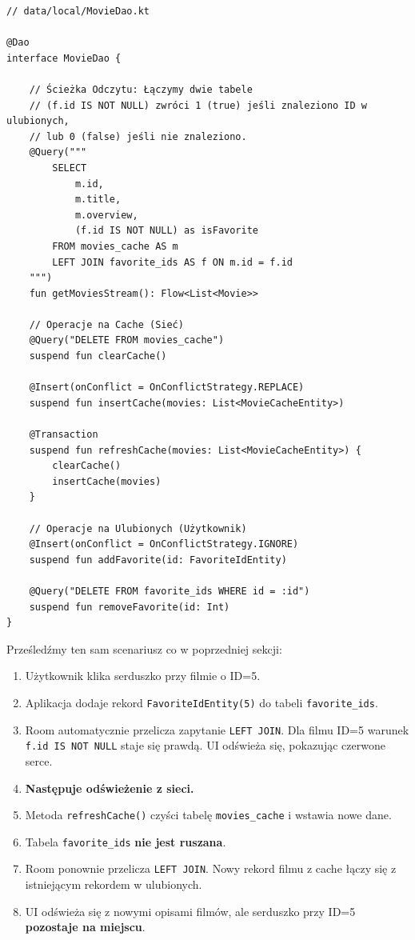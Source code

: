 \begin{verbatim}
// data/local/MovieDao.kt

@Dao
interface MovieDao {

    // Ścieżka Odczytu: Łączymy dwie tabele
    // (f.id IS NOT NULL) zwróci 1 (true) jeśli znaleziono ID w ulubionych,
    // lub 0 (false) jeśli nie znaleziono.
    @Query("""
        SELECT 
            m.id, 
            m.title, 
            m.overview,
            (f.id IS NOT NULL) as isFavorite
        FROM movies_cache AS m
        LEFT JOIN favorite_ids AS f ON m.id = f.id
    """)
    fun getMoviesStream(): Flow<List<Movie>>

    // Operacje na Cache (Sieć)
    @Query("DELETE FROM movies_cache")
    suspend fun clearCache()

    @Insert(onConflict = OnConflictStrategy.REPLACE)
    suspend fun insertCache(movies: List<MovieCacheEntity>)

    @Transaction
    suspend fun refreshCache(movies: List<MovieCacheEntity>) {
        clearCache()
        insertCache(movies)
    }

    // Operacje na Ulubionych (Użytkownik)
    @Insert(onConflict = OnConflictStrategy.IGNORE)
    suspend fun addFavorite(id: FavoriteIdEntity)

    @Query("DELETE FROM favorite_ids WHERE id = :id")
    suspend fun removeFavorite(id: Int)
}
\end{verbatim}

Prześledźmy ten sam scenariusz co w poprzedniej sekcji:

\begin{enumerate}
    \item Użytkownik klika serduszko przy filmie o ID=5.
    \item Aplikacja dodaje rekord \texttt{FavoriteIdEntity(5)} do tabeli \texttt{favorite\_ids}.
    \item Room automatycznie przelicza zapytanie \texttt{LEFT JOIN}. Dla filmu ID=5 warunek \texttt{f.id IS NOT NULL} staje się prawdą. UI odświeża się, pokazując czerwone serce.
    \item \textbf{Następuje odświeżenie z sieci.}
    \item Metoda \texttt{refreshCache()} czyści tabelę \texttt{movies\_cache} i wstawia nowe dane.
    \item Tabela \texttt{favorite\_ids} \textbf{nie jest ruszana}.
    \item Room ponownie przelicza \texttt{LEFT JOIN}. Nowy rekord filmu z cache łączy się z istniejącym rekordem w ulubionych.
    \item UI odświeża się z nowymi opisami filmów, ale serduszko przy ID=5 \textbf{pozostaje na miejscu}.
\end{enumerate}

